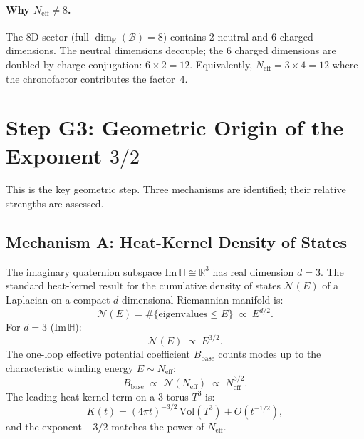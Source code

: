 \documentclass[12pt,a4paper]{article}
\theoremstyle{definition}
\theoremstyle{remark}
\begin{document}
\paragraph{Why $N_\mathrm{eff} \ne 8$.}
The 8D sector (full $\dim_\mathbb{R}(\mathcal{B}) = 8$) contains 2 neutral and 6
charged dimensions.  The neutral dimensions decouple; the 6 charged dimensions are
doubled by charge conjugation: $6 \times 2 = 12$.  Equivalently,
$N_\mathrm{eff} = 3 \times 4 = 12$ where the chronofactor contributes the factor~4.

\section{Step G3: Geometric Origin of the Exponent $3/2$}
\label{sec:g5:exp}

This is the key geometric step.  Three mechanisms are identified; their relative
strengths are assessed.

\subsection{Mechanism A: Heat-Kernel Density of States}
\label{sec:g5:hk}

The imaginary quaternion subspace $\mathrm{Im}\,\mathbb{H} \cong \mathbb{R}^3$ has
real dimension $d = 3$.  The standard heat-kernel result for the cumulative density
of states $\mathcal{N}(E)$ of a Laplacian on a compact $d$-dimensional Riemannian
manifold is:
\begin{equation}
  \mathcal{N}(E) = \#\{\text{eigenvalues} \le E\} \;\propto\; E^{d/2}.
  \label{eq:g5:hk}
\end{equation}
For $d = 3$ ($\mathrm{Im}\,\mathbb{H}$):
\begin{equation}
  \mathcal{N}(E) \;\propto\; E^{3/2}.
  \label{eq:g5:hk3}
\end{equation}
The one-loop effective potential coefficient $B_\mathrm{base}$ counts modes up to
the characteristic winding energy $E \sim N_\mathrm{eff}$:
\begin{equation}
  B_\mathrm{base} \;\propto\; \mathcal{N}(N_\mathrm{eff}) \;\propto\; N_\mathrm{eff}^{3/2}.
  \label{eq:g5:Bbase_hk}
\end{equation}
The leading heat-kernel term on a 3-torus $T^3$ is:
\begin{equation}
  K(t) = (4\pi t)^{-3/2}\,\mathrm{Vol}(T^3) + O(t^{-1/2}),
  \label{eq:g5:hk_T3}
\end{equation}
and the exponent $-3/2$ matches the power of $N_\mathrm{eff}$.
\end{document}
